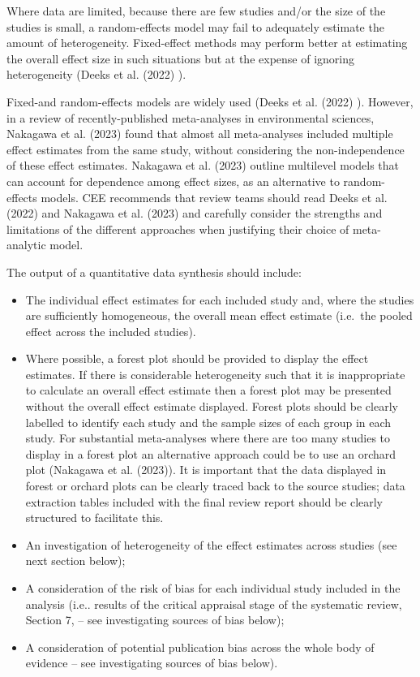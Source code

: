 \documentclass[
  letterpaper,
  DIV=11,
  numbers=noendperiod]{scrreprt}
\begin{document}
Where data are limited, because there are few studies and/or the size of
the studies is small, a random-effects model may fail to adequately
estimate the amount of heterogeneity. Fixed-effect methods may perform
better at estimating the overall effect size in such situations but at
the expense of ignoring heterogeneity (Deeks et al. (2022) ).

Fixed-and random-effects models are widely used (Deeks et al. (2022) ).
However, in a review of recently-published meta-analyses in
environmental sciences, {Nakagawa et al.} (2023) found that almost all
meta-analyses included multiple effect estimates from the same study,
without considering the non-independence of these effect estimates.
{Nakagawa et al.} (2023) outline multilevel models that can account for
dependence among effect sizes, as an alternative to random-effects
models. CEE recommends that review teams should read Deeks et al. (2022)
and {Nakagawa et al.} (2023) and carefully consider the strengths and
limitations of the different approaches when justifying their choice of
meta-analytic model.

The output of a quantitative data synthesis should include:

\begin{itemize}
\item
  The individual effect estimates for each included study and, where the
  studies are sufficiently homogeneous, the overall mean effect estimate
  (i.e.~the pooled effect across the included studies).
\item
  Where possible, a forest plot should be provided to display the effect
  estimates. If there is considerable heterogeneity such that it is
  inappropriate to calculate an overall effect estimate then a forest
  plot may be presented without the overall effect estimate displayed.
  Forest plots should be clearly labelled to identify each study and the
  sample sizes of each group in each study. For substantial
  meta-analyses where there are too many studies to display in a forest
  plot an alternative approach could be to use an orchard plot
  ({Nakagawa et al.} (2023)). It is important that the data displayed in
  forest or orchard plots can be clearly traced back to the source
  studies; data extraction tables included with the final review report
  should be clearly structured to facilitate this.
\item
  An investigation of heterogeneity of the effect estimates across
  studies (see next section below);
\item
  A consideration of the risk of bias for each individual study included
  in the analysis (i.e.. results of the critical appraisal stage of the
  systematic review, Section 7, -- see investigating sources of bias
  below);
\item
  A consideration of potential publication bias across the whole body of
  evidence -- see investigating sources of bias below).
\end{itemize}
\end{document}
